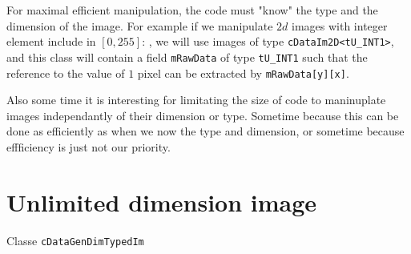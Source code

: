 For maximal efficient manipulation, the code must "know" the type and the dimension
of the image.  For example if we manipulate $2d$ images with integer element 
include in $[0,255]$: , we will use images of type {\tt cDataIm2D<tU\_INT1>},
and this class will contain a field {\tt mRawData} of type {\tt tU\_INT1}
such that the reference to the value of $1$ pixel can be extracted by   {\tt mRawData[y][x]}.

Also some time it is interesting for limitating the size of code to maninuplate  images
independantly of their dimension or type. Sometime because this can be done as efficiently
as when we now the type and dimension, or sometime because effficiency is just not our priority.







\section{Unlimited dimension image}
\label{UlimDimIm}

Classe {\tt cDataGenDimTypedIm}



